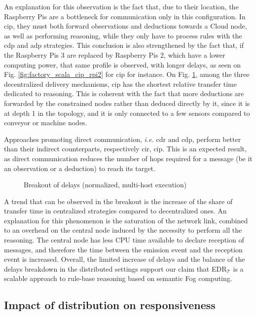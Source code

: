 \documentclass[sw]{iosart2x}
\newcommand{\edrt}{EDR$_{\mathcal{T}}$\xspace}
\begin{document}
An explanation for this observation is the fact that, due to their location, the Raspberry Pis are a bottleneck for communication only in this configuration. 
In \gls{cip}, they must both forward observations and deductions towards a Cloud node, as well as performing reasoning, while they only have to process rules with the \gls{cdp} and \gls{adp} strategies.
This conclusion is also strengthened by the fact that, if the Raspberry Pis 3 are replaced by Raspberry Pis 2, which have a lower computing power, that same profile is observed, with longer delays, as seen on Fig. \ref{fig:factory_scala_cip_rpi2} for \gls{cip} for instance.
On Fig. \ref{fig:breakout_delays_rpi}, among the three decentralized delivery mechanisms, \gls{cip} has the shortest relative transfer time dedicated to reasoning.
This is coherent with the fact that more deductions are forwarded by the constrained nodes rather than deduced directly by it, since it is at depth 1 in the topology, and it is only connected to a few sensors compared to conveyor or machine nodes.

Approaches promoting direct communication, \textit{i.e.} \gls{cdr} and \gls{cdp}, perform better than their indirect counterparts, respectively \gls{cir}, \gls{cip}.
This is an expected result, as direct communication reduces the number of hops required for a message (be it an observation or a deduction) to reach its target.

\begin{figure}
	\caption{Breakout of delays (normalized, multi-host execution)}
	\label{fig:breakout_delays_rpi}
	\scalebox{0.75}{
		
	}
\end{figure}

A trend that can be observed in the breakout is the increase of the share of transfer time in centralized strategies compared to decentralized ones. 
An explanation for this phenomenon is the saturation of the network link, combined to an overhead on the central node induced by the necessity to perform all the reasoning. 
The central node has less CPU time available to declare reception of messages, and therefore the time between the emission event and the reception event is increased.
Overall, the limited increase of delays and the balance of the delays breakdown in the distributed settings support our claim that \edrt is a scalable approach to rule-base reasoning based on semantic Fog computing.

\subsection{Impact of distribution on responsiveness}
\label{subs:factory_distribution}
\end{document}
